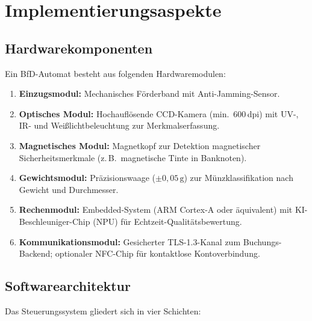 ﻿\documentclass[a4paper,12pt]{article}
\theoremstyle{definition}
\begin{document}
\section{Implementierungsaspekte}
\label{sec:implementierung}

\subsection{Hardwarekomponenten}

Ein BfD-Automat besteht aus folgenden Hardwaremodulen:

\begin{enumerate}
  \item \textbf{Einzugsmodul:} Mechanisches Förderband mit Anti-Jamming-Sensor.
  \item \textbf{Optisches Modul:} Hochauflösende CCD-Kamera (min.\ 600\,dpi) mit
        UV-, IR- und Weißlichtbeleuchtung zur Merkmalserfassung.
  \item \textbf{Magnetisches Modul:} Magnetkopf zur Detektion magnetischer
        Sicherheitsmerkmale (z.\,B.\ magnetische Tinte in Banknoten).
  \item \textbf{Gewichtsmodul:} Präzisionswaage ($\pm 0{,}05\,\text{g}$) zur
        Münzklassifikation nach Gewicht und Durchmesser.
  \item \textbf{Rechenmodul:} Embedded-System (ARM Cortex-A oder äquivalent)
        mit KI-Beschleuniger-Chip (NPU) für Echtzeit-Qualitätsbewertung.
  \item \textbf{Kommunikationsmodul:} Gesicherter TLS-1.3-Kanal zum
        Buchungs-Backend; optionaler NFC-Chip für kontaktlose Kontoverbindung.
\end{enumerate}

\subsection{Softwarearchitektur}

Das Steuerungssystem gliedert sich in vier Schichten:
\end{document}
